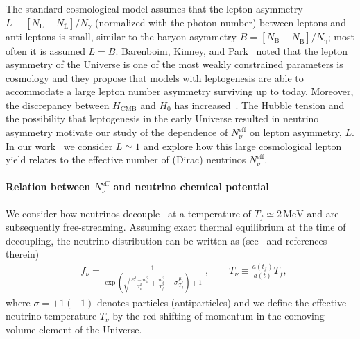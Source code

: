 The standard cosmological model assumes that the lepton asymmetry $L\equiv  [N_\mathrm{L}-N_{\overline{\mathrm{L}}}] /N_\gamma $  (normalized with the photon number) 
between leptons and anti-leptons is small, similar to the baryon asymmetry $B=[N_\mathrm{B}-N_{\overline{\mathrm{B}}}]/N_\gamma $; most often it is assumed $L=B$. Barenboim, Kinney, and Park~\cite{Barenboim:2016shh,Barenboim:2017dfq} noted that the lepton asymmetry of the Universe is one of the most weakly constrained parameters is cosmology and they propose that models with leptogenesis are able to accommodate a large lepton number asymmetry surviving up to today.  Moreover, the discrepancy between $H_\mathrm{CMB}$ and $H_0$ has increased~\cite{riess2018new,Riess:2018byc,Planck:2018vyg}. The Hubble tension and the possibility that leptogenesis in the early Universe resulted in neutrino asymmetry motivate our study of the dependence of $N_\nu^{\mathrm{eff}}$ on lepton asymmetry, $L$. In our work~\cite{Yang:2018oqg} we consider $L\simeq 1$ and explore how this large cosmological lepton yield relates to the effective number of (Dirac) neutrinos $N^{\mathrm{eff}}_\nu$. 

\paragraph{Relation between $N_\nu^{\mathrm{eff}}$ and neutrino chemical potential}
We consider how neutrinos decouple~\cite{Birrell:2014gea} at a temperature of $T_f\simeq 2\,\mathrm{MeV}$ and are subsequently free-streaming. Assuming exact thermal equilibrium at the time of decoupling, the neutrino distribution can be   written as (see~\cite{Birrell:2012gg} and references therein)
\begin{align}
\label{fnudef}
&f_\nu=\frac{1}{\exp{\left(\sqrt{\frac{E^2-m_\nu^2}{T_\nu^2}+\frac{m^2_\nu}{T^2_f}}-\sigma\frac{\mu_\nu}{T_f}\right)+1}}\;,\qquad T_\nu\equiv\frac{a(t_f)}{a(t)}T_f,
\end{align}
where $\sigma=+1(-1)$ denotes particles (antiparticles) and we define the effective neutrino temperature $T_\nu$  by the red-shifting of momentum in the comoving volume element of the Universe.

